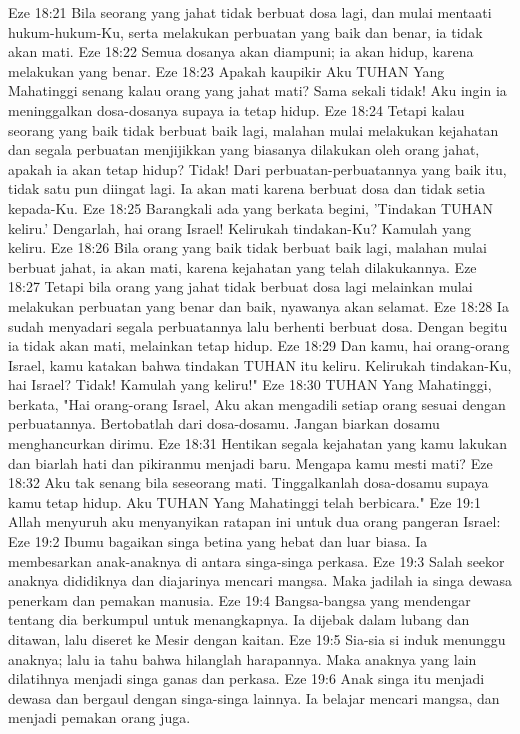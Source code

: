 Eze 18:21  Bila seorang yang jahat tidak berbuat dosa lagi, dan mulai mentaati hukum-hukum-Ku, serta melakukan perbuatan yang baik dan benar, ia tidak akan mati.
Eze 18:22  Semua dosanya akan diampuni; ia akan hidup, karena melakukan yang benar.
Eze 18:23  Apakah kaupikir Aku TUHAN Yang Mahatinggi senang kalau orang yang jahat mati? Sama sekali tidak! Aku ingin ia meninggalkan dosa-dosanya supaya ia tetap hidup.
Eze 18:24  Tetapi kalau seorang yang baik tidak berbuat baik lagi, malahan mulai melakukan kejahatan dan segala perbuatan menjijikkan yang biasanya dilakukan oleh orang jahat, apakah ia akan tetap hidup? Tidak! Dari perbuatan-perbuatannya yang baik itu, tidak satu pun diingat lagi. Ia akan mati karena berbuat dosa dan tidak setia kepada-Ku.
Eze 18:25  Barangkali ada yang berkata begini, 'Tindakan TUHAN keliru.' Dengarlah, hai orang Israel! Kelirukah tindakan-Ku? Kamulah yang keliru.
Eze 18:26  Bila orang yang baik tidak berbuat baik lagi, malahan mulai berbuat jahat, ia akan mati, karena kejahatan yang telah dilakukannya.
Eze 18:27  Tetapi bila orang yang jahat tidak berbuat dosa lagi melainkan mulai melakukan perbuatan yang benar dan baik, nyawanya akan selamat.
Eze 18:28  Ia sudah menyadari segala perbuatannya lalu berhenti berbuat dosa. Dengan begitu ia tidak akan mati, melainkan tetap hidup.
Eze 18:29  Dan kamu, hai orang-orang Israel, kamu katakan bahwa tindakan TUHAN itu keliru. Kelirukah tindakan-Ku, hai Israel? Tidak! Kamulah yang keliru!"
Eze 18:30  TUHAN Yang Mahatinggi, berkata, "Hai orang-orang Israel, Aku akan mengadili setiap orang sesuai dengan perbuatannya. Bertobatlah dari dosa-dosamu. Jangan biarkan dosamu menghancurkan dirimu.
Eze 18:31  Hentikan segala kejahatan yang kamu lakukan dan biarlah hati dan pikiranmu menjadi baru. Mengapa kamu mesti mati?
Eze 18:32  Aku tak senang bila seseorang mati. Tinggalkanlah dosa-dosamu supaya kamu tetap hidup. Aku TUHAN Yang Mahatinggi telah berbicara."
Eze 19:1  Allah menyuruh aku menyanyikan ratapan ini untuk dua orang pangeran Israel:
Eze 19:2  Ibumu bagaikan singa betina yang hebat dan luar biasa. Ia membesarkan anak-anaknya di antara singa-singa perkasa.
Eze 19:3  Salah seekor anaknya dididiknya dan diajarinya mencari mangsa. Maka jadilah ia singa dewasa penerkam dan pemakan manusia.
Eze 19:4  Bangsa-bangsa yang mendengar tentang dia berkumpul untuk menangkapnya. Ia dijebak dalam lubang dan ditawan, lalu diseret ke Mesir dengan kaitan.
Eze 19:5  Sia-sia si induk menunggu anaknya; lalu ia tahu bahwa hilanglah harapannya. Maka anaknya yang lain dilatihnya menjadi singa ganas dan perkasa.
Eze 19:6  Anak singa itu menjadi dewasa dan bergaul dengan singa-singa lainnya. Ia belajar mencari mangsa, dan menjadi pemakan orang juga.
